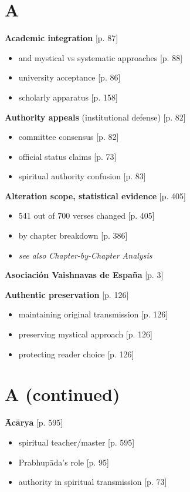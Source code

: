 \documentclass[11pt,twoside]{book}
\begin{document}
\section*{A}
\label{sec:org71fe370}

\textbf{\textbf{Academic integration}} {[}p. 87]
\begin{itemize}
\item and mystical vs systematic approaches [p. 88]
\item university acceptance [p. 86]
\item scholarly apparatus [p. 158]
\end{itemize}

\textbf{\textbf{Authority appeals}} (institutional defense) [p. 82]
\begin{itemize}
\item committee consensus [p. 82]
\item official status claims [p. 73]
\item spiritual authority confusion [p. 83]
\end{itemize}

\textbf{\textbf{Alteration scope, statistical evidence}} {[}p. 405]
\begin{itemize}
\item 541 out of 700 verses changed [p. 405]
\item by chapter breakdown [p. 386]
\item \emph{see also Chapter-by-Chapter Analysis}
\end{itemize}

\textbf{\textbf{Asociación Vaishnavas de España}} {[}p. 3]

\textbf{\textbf{Authentic preservation}} {[}p. 126]
\begin{itemize}
\item maintaining original transmission [p. 126]
\item preserving mystical approach [p. 126]
\item protecting reader choice [p. 126]
\end{itemize}
\section*{A (continued)}
\label{sec:orgf06fb88}

\textbf{\textbf{Ācārya}} {[}p. 595]
\begin{itemize}
\item spiritual teacher/master [p. 595]
\item Prabhupāda's role [p. 95]
\item authority in spiritual transmission [p. 73]
\end{itemize}
\end{document}
